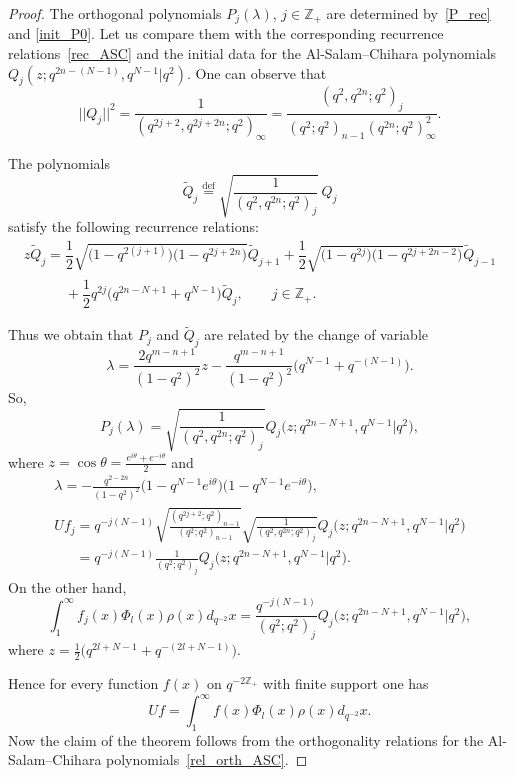 \documentclass[11pt]{article}
\begin{document}
\begin{proof}
The orthogonal polynomials $P_j(\lambda)$, $j\in\mathbb{Z}_+$ are determined by~\eqref{P_rec} and
\eqref{init_P0}. Let us compare them with the corresponding recurrence relations~\eqref{rec_ASC} and the
initial data for the Al-Salam--Chihara polynomials $Q_j(z;q^{2n-(N-1)},q^{N-1}|q^2)$. One can observe that
\[
||Q_j||^2=\frac{1}{(q^{2j+2},q^{2j+2n};q^2)_\infty}=\frac{(q^2,q^{2n};q^2)_j}{(q^2;q^2)_{n-1}(q^{2n};q^2)^2_\infty}.
\]

The polynomials
\[
\widetilde{Q}_j\overset{\mathrm{def}}{=}\sqrt{\frac{1}{(q^2,q^{2n};q^2)_j}} \,Q_j
\]
satisfy the following recurrence relations:
\begin{gather*}
z\widetilde{Q}_j=\dfrac12\sqrt{\big(1-q^{2(j+1)}\big)\big(1-q^{2j+2n}\big)}\widetilde{Q}_{j+1}+
\dfrac12\sqrt{\big(1-q^{2j}\big)\big(1-q^{2j+2n-2}\big)}\widetilde{Q}_{j-1}\\
\phantom{z\widetilde{Q}_j=}{} +\dfrac12q^{2j}\big(q^{2n-N+1}+q^{N-1}\big)\widetilde{Q}_j, \qquad j \in \mathbb Z_+.
\end{gather*}

Thus we obtain that $P_j$ and $\widetilde{Q}_j$ are related by the change of variable
\[
\lambda=\frac{2q^{m-n+1}}{(1-q^2)^2}z-\frac{q^{m-n+1}}{(1-q^2)^2}\big(q^{N-1}+q^{-(N-1)}\big).
\]
So,
\[
P_j(\lambda)=\sqrt{\frac{1}{(q^2,q^{2n};q^2)_j}}  Q_j\big(z;q^{2n-N+1},q^{N-1}|q^2\big),
\]
where $z=\cos \theta=\frac{e^{i\theta}+e^{-i\theta}}{2}$ and
\begin{gather*}
\lambda=-\frac{q^{2-2n}}{(1-q^2)^2}\big(1-q^{N-1}e^{i\theta}\big)\big(1-q^{N-1}e^{-i\theta}\big),\\
Uf_j=q^{-j(N-1)}\sqrt{\frac{(q^{2j+2};q^2)_{n-1}}{(q^{2};q^2)_{n-1}}}\sqrt{\frac{1}{(q^2,q^{2n};q^2)_j}}
Q_j\big(z;q^{2n-N+1},q^{N-1}|q^2\big) \\
\phantom{Uf_j}{} =q^{-j(N-1)}\frac{1}{(q^2;q^2)_j} Q_j\big(z;q^{2n-N+1},q^{N-1}|q^2\big).
\end{gather*}
On the other hand,
\[
\int_1^\infty
f_j(x)\Phi_{l}(x)\rho(x)d_{q^{-2}}x=\frac{q^{-j(N-1)}}{(q^2;q^2)_j} Q_j\big(z;q^{2n-N+1},q^{N-1}|q^2\big),
\]
where $z=\frac12\big(q^{2l+N-1}+q^{-(2l+N-1)}\big)$.

Hence for every function $f(x)$ on $q^{-2\mathbb{Z}_+}$ with f\/inite support one has
\[
Uf=\int_1^\infty f(x)\Phi_{l}(x)\rho(x)d_{q^{-2}}x.
\]
Now the claim of the theorem follows from the orthogonality relations for the Al-Salam--Chihara polynomials~\eqref{rel_orth_ASC}. \end{proof}
\end{document}
